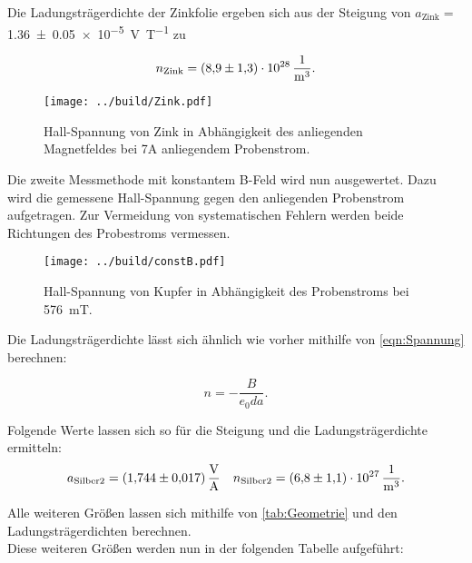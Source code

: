 \noindent Die Ladungsträgerdichte der Zinkfolie ergeben sich aus der Steigung von $a_\text{Zink}=$\qty{1.36\pm0.05e-5}{\volt\per\tesla}
zu 

\begin{equation*}
    n_\text{Zink} = \qty{8.9\pm1.3e28}{\per\cubic\meter}.
\end{equation*}

\begin{figure}[H]
    \centering
    \label{Zink}
    \texttt{[image: ../build/Zink.pdf]}
    \caption{Hall-Spannung von Zink in Abhängigkeit des anliegenden Magnetfeldes bei 7A anliegendem Probenstrom.}
\end{figure}

\noindent Die zweite Messmethode mit konstantem B-Feld wird nun ausgewertet. Dazu wird die gemessene Hall-Spannung 
gegen den anliegenden Probenstrom aufgetragen. Zur Vermeidung von systematischen Fehlern werden beide Richtungen des 
Probestroms vermessen.

\begin{figure}[H]
    \centering
    \texttt{[image: ../build/constB.pdf]}
    \caption{Hall-Spannung von Kupfer in Abhängigkeit des Probenstroms bei \qty{576}{\milli\tesla}.}
\end{figure}

\noindent Die Ladungsträgerdichte lässt sich ähnlich wie vorher mithilfe von \eqref{eqn:Spannung} berechnen:

\begin{equation*}
    n = - \frac{B}{e_0 d a}.
\end{equation*}

\noindent Folgende Werte lassen sich so für die Steigung und die Ladungsträgerdichte ermitteln:
\begin{align*}
    a_\text{Silber2}=\qty{1.744 \pm 0.017}{\volt\per\ampere} && n_\text{Silber2} = \qty{6.8\pm 1.1e27}{\per\cubic\meter}.
\end{align*}

\noindent Alle weiteren Größen lassen sich mithilfe von \autoref{tab:Geometrie} und den Ladungsträgerdichten 
berechnen.\\
\noindent Diese weiteren Größen werden nun in der folgenden Tabelle aufgeführt:

